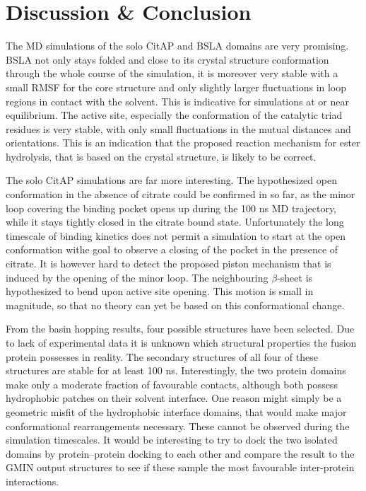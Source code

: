 \documentclass[english, a4paper, 12pt, titlepage, draft]{article}
\begin{document}

\section{Discussion \& Conclusion}

The MD simulations of the solo CitAP and BSLA domains are very promising.
BSLA not only stays folded and close to its crystal structure conformation through the whole course of the simulation, it is moreover very stable with a small RMSF for the core structure and only slightly larger fluctuations in loop regions in contact with the solvent.
This is indicative for simulations at or near equilibrium.
The active site, especially the conformation of the catalytic triad residues is very stable, with only small fluctuations in the mutual distances and orientations.
This is an indication that the proposed reaction mechanism for ester hydrolysis, that is based on the crystal structure, is likely to be correct.

The solo CitAP simulations are far more interesting.
The hypothesized open conformation in the absence of citrate could be confirmed in so far, as the minor loop covering the binding pocket opens up during the 100 ns MD trajectory, while it stays tightly closed in the citrate bound state.
Unfortunately the long timescale of binding kinetics does not permit a simulation to start at the open conformation withe goal to observe a closing of the pocket in the presence of citrate.
It is however hard to detect the proposed piston mechanism that is induced by the opening of the minor loop.
The neighbouring $\beta$-sheet is hypothesized to bend upon active site opening.
This motion is small in magnitude, so that no theory can yet be based on this conformational change.

From the basin hopping results, four possible structures have been selected.
Due to lack of experimental data it is unknown which structural properties the fusion protein possesses in reality.
The secondary structures of all four of these structures are stable for at least 100 ns.
Interestingly, the two protein domains make only a moderate fraction of favourable contacts, although both possess hydrophobic patches on their solvent interface.
One reason might simply be a geometric misfit of the hydrophobic interface domains, that would make major conformational rearrangements necessary.
These cannot be observed during the simulation timescales.
It would be interesting to try to dock the two isolated domains by protein--protein docking to each other and compare the result to the GMIN output structures to see if these sample the most favourable inter-protein interactions.
\end{document}
